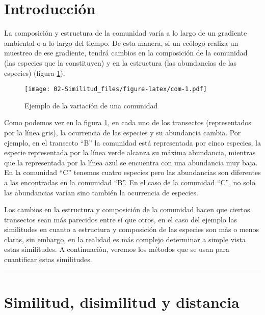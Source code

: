 \documentclass[
]{article}
\author{}
\date{\vspace{-2.5em}}
\begin{document}
{
\setcounter{tocdepth}{2}
\tableofcontents
}
\hypertarget{introducciuxf3n}{%
\section{Introducción}\label{introducciuxf3n}}

La composición y estructura de la comunidad varía a lo largo de un gradiente ambiental o a lo largo del tiempo. De esta manera, si un ecólogo realiza un muestreo de ese gradiente, tendrá cambios en la composición de la comunidad (las especies que la constituyen) y en la estructura (las abundancias de las especies) (figura \ref{fig:com}).

\begin{figure}
\centering
\texttt{[image: 02-Similitud\_files/figure-latex/com-1.pdf]}
\caption{\label{fig:com}Ejemplo de la variación de una comunidad}
\end{figure}

Como podemos ver en la figura \ref{fig:com}, en cada uno de los transectos (representados por la línea gris), la ocurrencia de las especies y su abundancia cambia. Por ejemplo, en el transecto ``B'' la comunidad está representada por cinco especies, la especie representada por la línea verde alcanza su máxima abundancia, mientras que la representada por la línea azul se encuentra con una abundancia muy baja. En la comunidad ``C'' tenemos cuatro especies pero las abundancias son diferentes a las encontradas en la comunidad ``B''. En el caso de la comunidad ``C'', no solo las abundancias varían sino también la ocurrencia de especies.

Los cambios en la estructura y composición de la comunidad hacen que ciertos transectos sean más parecidos entre sí que otros, en el caso del ejemplo las similitudes en cuanto a estructura y composición de las especies son más o menos claras, sin embargo, en la realidad es más complejo determinar a simple vista estas similitudes. A continuación, veremos los métodos que se usan para cuantificar estas similitudes.

\begin{center}\rule{0.5\linewidth}{0.5pt}\end{center}

\hypertarget{similitud-disimilitud-y-distancia}{%
\section{Similitud, disimilitud y distancia}\label{similitud-disimilitud-y-distancia}}
\end{document}
